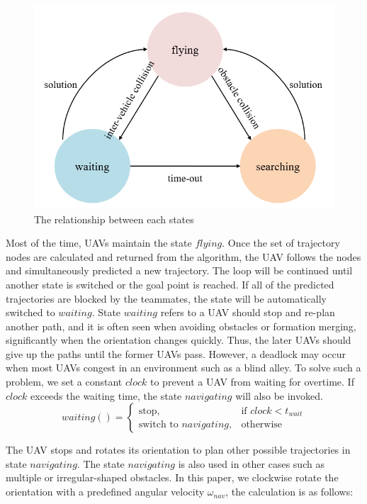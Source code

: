 \begin{figure}[H]
    \centering
    \includegraphics[scale=1]{figures/states.png}
    \caption{The relationship between each states}
    \label{fig:states}
\end{figure}

Most of the time, UAVs maintain the state $flying$. Once the set of trajectory nodes are calculated and returned from the algorithm, the UAV follows the nodes and simultaneously predicted a new trajectory. The loop will be continued until another state is switched or the goal point is reached. If all of the predicted trajectories are blocked by the teammates, the state will be automatically switched to $waiting$. State $waiting$ refers to a UAV should stop and re-plan another path, and it is often seen when avoiding obstacles or formation merging, significantly when the orientation changes quickly. Thus, the later UAVs should give up the paths until the former UAVs pass. However, a deadlock may occur when most UAVs congest in an environment such as a blind alley. To solve such a problem, we set a constant $clock$ to prevent a UAV from waiting for overtime. If $clock$ exceeds the waiting time, the state $navigating$ will also be invoked.
\[
    waiting()= 
\begin{cases}
    \text{stop},& \text{if } clock<t_{wait}\\
    \text{switch to } navigating, & \text{otherwise}
\end{cases}
\]

The UAV stops and rotates its orientation to plan other possible trajectories in state $navigating$. The state $navigating$ is also used in other cases such as multiple or irregular-shaped obstacles. In this paper, we clockwise rotate the orientation with a predefined angular velocity $\omega_{nav}$, the calculation is as follows:

